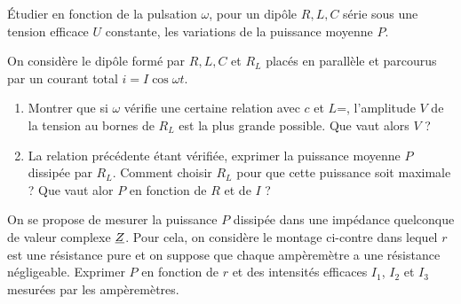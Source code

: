 	\begin{exercice}
		Étudier en fonction de la pulsation $\omega$, pour un dipôle $R, L, C$ série sous une tension efficace $U$ constante, les variations de la puissance moyenne $P$.
	\end{exercice}
	\begin{exercice}
		On considère le dipôle formé par $R, L, C$ et $R_L$ placés en parallèle et parcourus par un courant total $i = I\cos\omega t$.
		\begin{enumerate}
			\item Montrer que si $\omega$ vérifie une certaine relation avec $c$ et $L$=, l'amplitude $V$ de la tension au bornes de $R_L$ est la plus grande possible. Que vaut alors $V$ ?
			\item La relation précédente étant vérifiée, exprimer la puissance moyenne $P$ dissipée par $R_L$. Comment choisir $R_L$ pour que cette puissance soit maximale ? Que vaut alor $P$ en fonction de $R$ et de $I$ ?
		\end{enumerate}
	\end{exercice}
	\begin{exercice}
		On se propose de mesurer la puissance $P$ dissipée dans une impédance quelconque de valeur complexe $\underline{Z}$. Pour cela, on considère le montage ci-contre dans lequel $r$ est une résistance pure et on suppose que chaque ampèremètre a une résistance négligeable. Exprimer $P$ en fonction de $r$ et des intensités efficaces $I_1$, $I_2$ et $I_3$ mesurées par les ampèremètres.
	\end{exercice}

